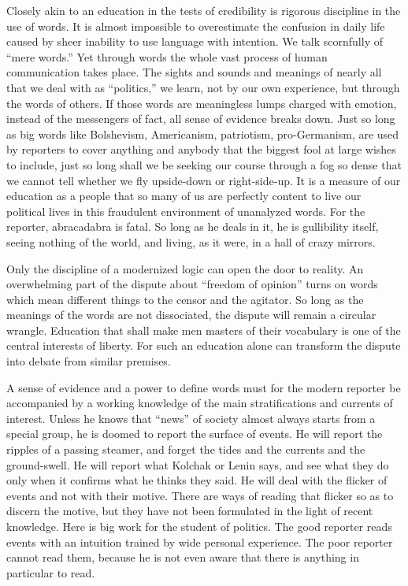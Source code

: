 \documentclass[openany,nobib,nohyper]{tufte-book}
\begin{document}
Closely akin to an education in the tests of credibility is rigorous
discipline in the use of words. It is almost impossible to overestimate
the confusion in daily life caused by sheer inability to use language
with intention. We talk scornfully of ``mere words.'' Yet through words
the whole vast process of human communication takes place. The sights
and sounds and meanings of nearly all that we deal with as ``politics,''
we learn, not by our own experience, but through the words of others. If
those words are meaningless lumps charged with emotion, instead of the
messengers of fact, all sense of evidence breaks down. Just so long as
big words like Bolshevism, Americanism, patriotism, pro-Germanism, are
used by reporters to cover anything and anybody that the biggest fool at
large wishes to include, just so long shall we be seeking our course
through a fog so dense that we cannot tell whether we fly upside-down or
right-side-up. It is a measure of our education as a people that so many
of us are perfectly content to live our political lives in this
fraudulent environment of unanalyzed words. For the reporter,
abracadabra is fatal. So long as he deals in it, he is gullibility
itself, seeing nothing of the world, and living, as it were, in a hall
of crazy mirrors.

Only the discipline of a modernized logic can open the door to reality.
An overwhelming part of the dispute about ``freedom of opinion'' turns
on words which mean different things to the censor and the agitator. So
long as the meanings of the words are not dissociated, the dispute will
remain a circular wrangle. Education that shall make men masters of
their vocabulary is one of the central interests of liberty. For such an
education alone can transform the dispute into debate from similar
premises.

A sense of evidence and a power to define words must for the modern
reporter be accompanied by a working knowledge of the main
stratifications and currents of interest. Unless he knows that ``news''
of society almost always starts from a special group, he is doomed to
report the surface of events. He will report the ripples of a passing
steamer, and forget the tides and the currents and the ground-swell. He
will report what Kolchak or Lenin says, and see what they do only when
it confirms what he thinks they said. He will deal with the flicker of
events and not with their motive. There are ways of reading that flicker
so as to discern the motive, but they have not been formulated in the
light of recent knowledge. Here is big work for the student of politics.
The good reporter reads events with an intuition trained by wide
personal experience. The poor reporter cannot read them, because he is
not even aware that there is anything in particular to read.
\end{document}
